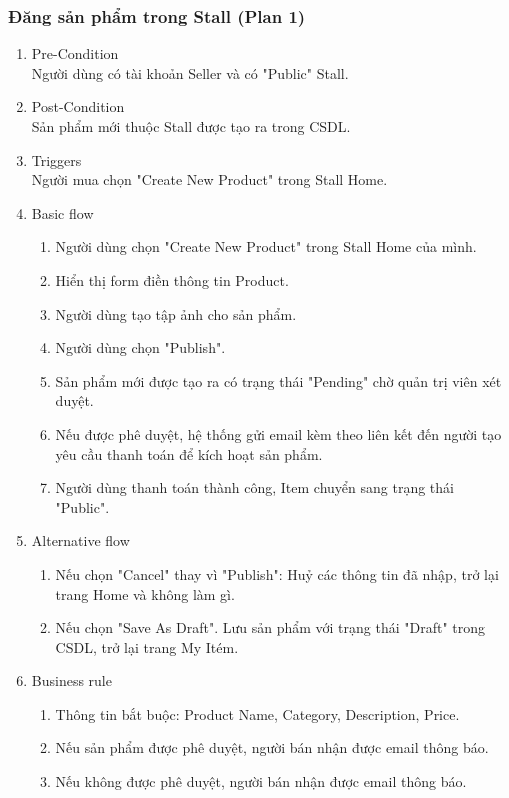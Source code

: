 \subsubsection{Đăng sản phẩm trong Stall (Plan 1)}
\begin{enumerate}
	\item Pre-Condition\\
	Người dùng có tài khoản Seller và có "Public" Stall.
	\item Post-Condition\\
	Sản phẩm mới thuộc Stall được tạo ra trong CSDL.
	\item Triggers\\
	Người mua chọn "Create New Product" trong Stall Home.
	\item Basic flow
	\begin{enumerate}
		\item Người dùng chọn "Create New Product" trong Stall Home của mình.
		\item Hiển thị form điền thông tin Product.
		\item Người dùng tạo tập ảnh cho sản phẩm.
		\item Người dùng chọn "Publish".
		\item Sản phẩm mới được tạo ra có trạng thái "Pending" chờ quản trị viên xét duyệt.
		\item Nếu được phê duyệt, hệ thống gửi email kèm theo liên kết đến người tạo yêu cầu thanh toán để kích hoạt sản phẩm.
		\item Người dùng thanh toán thành công, Item chuyển sang trạng thái "Public".
	\end{enumerate}
	\item Alternative flow
	\begin{enumerate}
		\item Nếu chọn "Cancel" thay vì "Publish": Huỷ các thông tin đã nhập, trở lại trang Home và không làm gì.
		\item Nếu chọn "Save As Draft". Lưu sản phẩm với trạng thái "Draft" trong CSDL, trở lại trang My Itém.
	\end{enumerate}
	\item Business rule
	\begin{enumerate}
		\item Thông tin bắt buộc: Product Name, Category, Description, Price.
		\item Nếu sản phẩm được phê duyệt, người bán nhận được email thông báo.
		\item Nếu không được phê duyệt, người bán nhận được email thông báo.
	\end{enumerate}
\end{enumerate}

